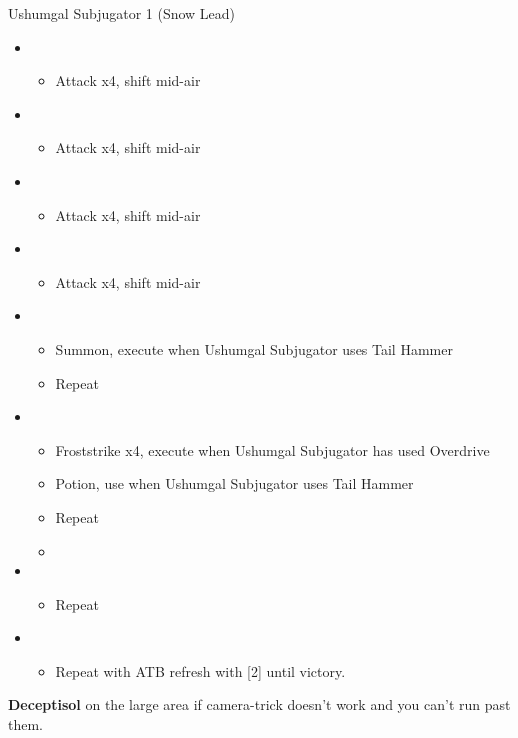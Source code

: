 	\begin{battle}[1:23]{Ushumgal Subjugator 1 (Snow Lead)}
		\begin{itemize}
			\item \first
			      \begin{itemize}
				      \item Attack x4, shift mid-air
			      \end{itemize}
			\item \second
			      \begin{itemize}
				      \item Attack x4, shift mid-air
			      \end{itemize}
			\item \first
			      \begin{itemize}
				      \item Attack x4, shift mid-air
			      \end{itemize}
			\item \second
			      \begin{itemize}
				      \item Attack x4, shift mid-air
			      \end{itemize}
			\item \first
			      \begin{itemize}
				      \item Summon, execute when Ushumgal Subjugator uses Tail Hammer
				      \item Repeat
			      \end{itemize}
			\item \fifth
			      \begin{itemize}
				      \item Froststrike x4, execute when Ushumgal Subjugator has used Overdrive
				      \item Potion, use when Ushumgal Subjugator uses Tail Hammer
				      \item Repeat
				      \item \stagger
			      \end{itemize}
			\item \sixth
			      \begin{itemize}
				      \item Repeat
			      \end{itemize}
			\item \first
			      \begin{itemize}
				      \item Repeat with ATB refresh with [2] until victory.
			      \end{itemize}
		\end{itemize}
	\end{battle}
	\textbf{Deceptisol} on the large area if camera-trick doesn't work and you can't run past them.

